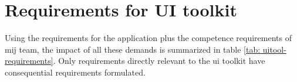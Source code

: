 

\section{Requirements for UI toolkit}

Using the requirements for the application plus the competence requirements of mij team, the impact of
all these demands is summarized in table \ref{tab: uitool-requirements}. Only requirements directly relevant
to the ui toolkit have consequential requirements formulated.

